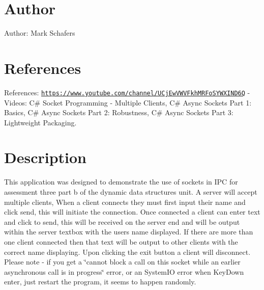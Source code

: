 \hypertarget{index_author_sec}{}\section{Author}\label{index_author_sec}
Author\+: Mark Schafers\hypertarget{index_reference_sec}{}\section{References}\label{index_reference_sec}
References\+: \href{https://www.youtube.com/channel/UCjEwVWVFkhMRFoSYWXIND6Q}{\tt https\+://www.\+youtube.\+com/channel/\+U\+Cj\+Ew\+V\+W\+V\+Fkh\+M\+R\+Fo\+S\+Y\+W\+X\+I\+N\+D6Q} -\/ Videos\+: C\# Socket Programming -\/ Multiple Clients, C\# Async Sockets Part 1\+: Basics, C\# Async Sockets Part 2\+: Robustness, C\# Async Sockets Part 3\+: Lightweight Packaging.\hypertarget{index_description_sec}{}\section{Description}\label{index_description_sec}
This application was designed to demonstrate the use of sockets in I\+PC for assessment three part b of the dynamic data structures unit. A server will accept multiple clients, When a client connects they must first input their name and click send, this will initiate the connection. Once connected a client can enter text and click to send, this will be received on the server end and will be output within the server textbox with the users name displayed. If there are more than one client connected then that text will be output to other clients with the correct name displaying. Upon clicking the exit button a client will disconnect. Please note -\/ if you get a \char`\"{}cannot block a call on this socket while an earlier asynchronous call is in progress\char`\"{} error, or an System\+IO error when Key\+Down enter, just restart the program, it seems to happen randomly. 